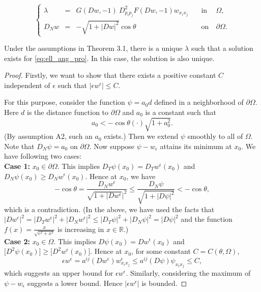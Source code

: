 \documentclass[10pt,a4paper]{amsart}
\begin{document}
\begin{equation} \label{eq:ell_ang_pro}
\left\{ \begin{array}{cllcl}
     \lambda & = & G (Dw,-1) \ D^2_{p_i p_j} F (Dw,-1) w_{x_i x_j}   \quad & \text{in} & \ \Omega,  \\
     D_N w & = & - \sqrt{1+|Dw|^2} \cos \theta \quad & \text{on} & \ \partial \Omega. 
\end{array} \right.
\end{equation}

\begin{theorem}
Under the assumptions in Theorem 3.1, there is a unique $\lambda$ such that a solution exists for \eqref{eq:ell_ang_pro}.
In this case, the solution is also unique.
\end{theorem}

\begin{proof}
Firstly, we want to show that there exists a positive constant $C$ independent of $\epsilon$ such that $|\epsilon w^{\epsilon}|\leq C$. 

For this purpose, consider the function $\psi=a_0 d$ defined in a neighborhood of $\partial\Omega$.
Here $d$ is the distance function to $\partial\Omega$ and $a_0$ is a constant such that 
\begin{equation*}
    a_0 < -\cos{\theta(\cdot)} \sqrt{1+a_0^2}.
\end{equation*}
(By assumption A2, such an $a_0$ exists.)
Then we extend $\psi$ smoothly to all of $\Omega$. Note that
$D_N\psi = a_0$ on $\partial\Omega$. Now suppose $\psi-w_{\epsilon}$ attains its minimum at $x_0$. We have following two cases: \\
\textbf{Case 1:} $x_0 \in \partial\Omega$. This implies $D_T \psi(x_0) = D_T w^{\epsilon}(x_0)$ and $D_N \psi(x_0) \geq D_N w^{\epsilon}(x_0)$. Hence at $x_0$, we have
\begin{equation*}
      -\cos{\theta} = \frac{D_N w^{\epsilon}}{\sqrt{1+|D w^{\epsilon}}|^2} \leq \frac{D_N \psi}{\sqrt{1+|D \psi|^2}} < -\cos{\theta},
\end{equation*}
which is a contradiction. (In the above, we have used the facts that 
$|Dw^\epsilon|^2 = |D_Tw^\epsilon|^2 + |D_Nw^\epsilon|^2
\leq
|D_T\psi|^2 + |D_N\psi|^2
=|D\psi|^2
$ and the function $f(x) = \frac{x}{\sqrt{c^2+x^2}}$ is increasing 
in $x\in\mathbb{R}$.)\\
\textbf{Case 2:} $x_0 \in \Omega$. This implies $D\psi(x_0) = D w^{\epsilon}(x_0)$ and $\big[ D^2 \psi(x_0) \big] \geq \big[ D^2 w^{\epsilon}(x_0) \big]$. Hence at $x_0$, for some constant $C=C(\theta, \Omega)$,
\begin{equation*}
    \epsilon w^{\epsilon} = a^{ij} (D w^{\epsilon}) w_{x_i x_j}^{\epsilon} \leq a^{ij} (D \psi) \psi_{x_i x_j} \leq C,
\end{equation*}
which suggests an upper bound for $\epsilon w^{\epsilon}$. Similarly, considering the maximum of $\psi-w_{\epsilon}$ suggests a lower bound. Hence $|\epsilon w^{\epsilon}|$ is bounded.


\end{proof}
\end{document}

